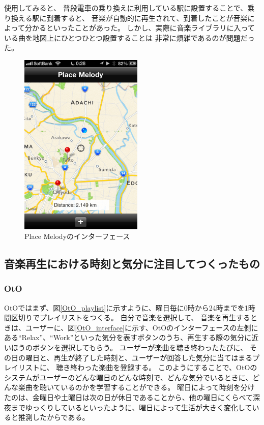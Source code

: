\documentclass[a4paper, 11pt, onecolumn, report]{jsarticle}
\begin{document}
使用してみると、
普段電車の乗り換えに利用している駅に設置することで、乗り換える駅に到着すると、
音楽が自動的に再生されて、到着したことが音楽によって分かるといったことがあった。
しかし、実際に音楽ライブラリに入っている曲を地図上にひとつひとつ設置することは
非常に煩雑であるのが問題だった。

\begin{figure}[h]
\begin{center}
\includegraphics[width=5.866cm]{placeMelody.png}
\caption{Place Melodyのインターフェース}
\label{placeMelody_interface}
\end{center}
\end{figure}



\subsection{音楽再生における時刻と気分に注目してつくったもの}

\subsubsection{OtO}
OtOではまず、図\ref{OtO_playlist}に示すように、曜日毎に0時から24時までを1時間区切りでプレイリストをつくる。
自分で音楽を選択して、
音楽を再生するときは、ユーザーに、図\ref{OtO_interface}に示す、OtOのインターフェースの左側にある``Relax''、``Work''といった気分を表すボタンのうち、再生する際の気分に近いほうのボタンを選択してもらう。
ユーザーが楽曲を聴き終わったたびに、
その日の曜日と、再生が終了した時刻と、ユーザーが回答した気分に当てはまるプレイリストに、
聴き終わった楽曲を登録する。
このようにすることで、OtOのシステムがユーザーのどんな曜日のどんな時刻で、どんな気分でいるときに、どんな楽曲を聴いているのかを学習することができる。
曜日によって時刻を分けたのは、金曜日や土曜日は次の日が休日であることから、他の曜日にくらべて深夜までゆっくりしているといったように、曜日によって生活が大きく変化していると推測したからである。
\end{document}
